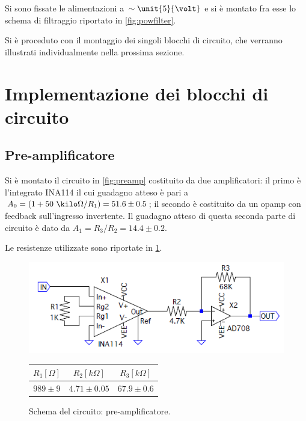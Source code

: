 \documentclass[a4paper,10pt]{article}
\begin{document}
Si sono fissate le alimentazioni a $\sim \unit{5}{\volt}$ e si è montato fra esse lo schema di filtraggio riportato in  \cref{fig:powfilter}.

Si è proceduto con il montaggio dei singoli blocchi di circuito, che verranno illustrati individualmente nella prossima sezione.

\vspace*{-10pt}

\section{Implementazione dei blocchi di circuito}

\subsection{Pre-amplificatore}

Si è montato il circuito in \cref{fig:preamp} costituito da due amplificatori: il primo è l'integrato INA114 il cui guadagno atteso è pari a $ A_0 = (1+ 50~\kilo\Omega/R_1) = 51.6 \pm 0.5$; il secondo è costituito da un opamp con feedback sull'ingresso invertente. Il guadagno atteso di questa seconda parte di circuito è dato da $A_1 = R_3/R_2 = 14.4 \pm 0.2 $.

Le resistenze utilizzate sono riportate in \cref{tab:resistenze}.

\vspace*{-10pt}

\begin{figure}[H]
	\begin{minipage}{0.59\textwidth}
		\centering
		\includegraphics[width=\textwidth]{../grafici/PreAmp.png}
		\vspace{-12pt}
		\caption{Schema del circuito: pre-amplificatore.}
		\label{fig:preamp}
	\end{minipage}
	\begin{minipage}{0.39\textwidth}
		\centering
		\begin{tabular}{ccc}
			\hline
			$R_1[\Omega]$ & $R_2[k\Omega]$ & $R_3[k\Omega]$\\
			\hline
			$989\pm9$ & $4.71\pm0.05$ & $67.9\pm0.6$\\
			\hline
		\end{tabular}
		\label{tab:resistenze}
	\end{minipage}
\end{figure}
\end{document}
